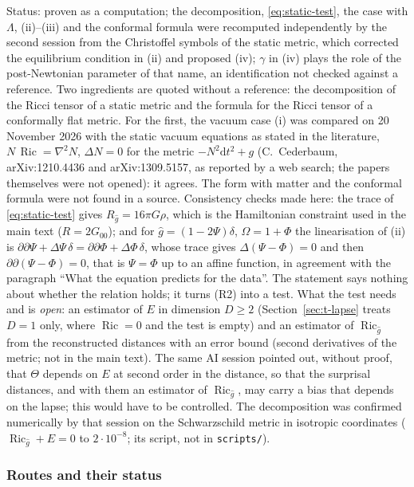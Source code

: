 \documentclass[11pt,a4paper]{article}
\theoremstyle{stmt}
\theoremstyle{defn}
\theoremstyle{rmk}
\numberwithin{equation}{section}
\DeclareMathOperator{\Ric}{Ric}
\newcommand{\status}[1]{\par\noindent\textsf{\small Status: #1}\par}
\newcommand{\dd}{\mathrm{d}}
\begin{document}
{\status{proven as a computation; the decomposition, \eqref{eq:static-test}, the case with $\Lambda$, (ii)--(iii) and the conformal formula were recomputed independently by the second session from the Christoffel symbols of the static metric, which corrected the equilibrium condition in (ii) and proposed (iv); $\gamma$ in (iv) plays the role of the post-Newtonian parameter of that name, an identification not checked against a reference. Two ingredients are quoted without a reference: the decomposition of the Ricci tensor of a static metric and the formula for the Ricci tensor of a conformally flat metric. For the first, the vacuum case (i) was compared on 20 November 2026 with the static vacuum equations as stated in the literature, $N\,\Ric=\nabla^2N$, $\Delta N=0$ for the metric $-N^2\dd t^2+g$ (C.~Cederbaum, arXiv:1210.4436 and arXiv:1309.5157, as reported by a web search; the papers themselves were not opened): it agrees. The form with matter and the conformal formula were not found in a source. Consistency checks made here: the trace of \eqref{eq:static-test} gives $R_{\hat g}=16\pi G\rho$, which is the Hamiltonian constraint used in the main text ($R=2G_{00}$); and for $\hat g=(1-2\Psi)\delta$, $\Omega=1+\Phi$ the linearisation of (ii) is $\partial\partial\Psi+\Delta\Psi\,\delta=\partial\partial\Phi+\Delta\Phi\,\delta$, whose trace gives $\Delta(\Psi-\Phi)=0$ and then $\partial\partial(\Psi-\Phi)=0$, that is $\Psi=\Phi$ up to an affine function, in agreement with the paragraph ``What the equation predicts for the data''. The statement says nothing about whether the relation holds; it turns (R2) into a test. What the test needs and is \emph{open}: an estimator of $E$ in dimension $D\ge2$ (Section~\ref{sec:t-lapse} treats $D=1$ only, where $\Ric=0$ and the test is empty) and an estimator of $\Ric_{\hat g}$ from the reconstructed distances with an error bound (second derivatives of the metric; not in the main text). The same AI session pointed out, without proof, that $\Theta$ depends on $E$ at second order in the distance, so that the surprisal distances, and with them an estimator of $\Ric_{\hat g}$, may carry a bias that depends on the lapse; this would have to be controlled. The decomposition was confirmed numerically by that session on the Schwarzschild metric in isotropic coordinates ($\Ric_{\hat g}+E=0$ to $2\cdot10^{-8}$; its script, not in \texttt{scripts/}).}

\subsubsection{Routes and their status}

}
\end{document}
